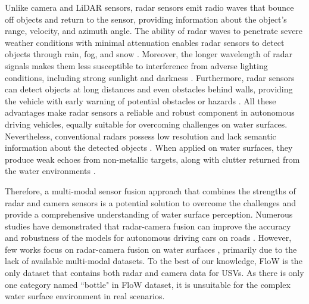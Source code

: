 \documentclass[lettersize,journal]{IEEEtran}
\begin{document}
Unlike camera and LiDAR sensors, radar sensors emit radio waves that bounce off objects and return to the sensor, providing information about the object's range, velocity, and azimuth angle. 
The ability of radar waves to penetrate severe weather conditions with minimal attenuation enables radar sensors to detect objects through rain, fog, and snow \cite{ouaknine2021carrada, bijelic2020seeing, yao2023radar}. 
Moreover, the longer wavelength of radar signals makes them less susceptible to interference from adverse lighting conditions, including strong sunlight and darkness \cite{bilik2022comparative}. 
Furthermore, radar sensors can detect objects at long distances and even obstacles behind walls, providing the vehicle with early warning of potential obstacles or hazards \cite{scheiner2020seeing}. 
All these advantages make radar sensors a reliable and robust component in autonomous driving vehicles, equally suitable for overcoming challenges on water surfaces.
Nevertheless, conventional radars possess low resolution and lack semantic information about the detected objects \cite{wang2021rodnet, liu2022deep}. When applied on water surfaces, they produce weak echoes from non-metallic targets, along with clutter returned from the water environments \cite{cheng2021flow, cheng2021robust}.  


Therefore, a multi-modal sensor fusion approach that combines the strengths of radar and camera sensors is a potential solution to overcome the challenges and provide a comprehensive understanding of water surface perception.
Numerous studies have demonstrated that radar-camera fusion can improve the accuracy and robustness of the models for autonomous driving cars on roads \cite{chadwick2019distant, nabati2021centerfusion, kim2023craft, yao2023radar}.
However, few works focus on radar-camera fusion on water surfaces \cite{cheng2021robust}, primarily due to the lack of available multi-modal datasets. 
To the best of our knowledge, FloW \cite{cheng2021flow} is the only dataset that contains both radar and camera data for USVs. As there is only one category named ``bottle" in FloW dataset, it is unsuitable for the complex water surface environment in real scenarios.
\end{document}
